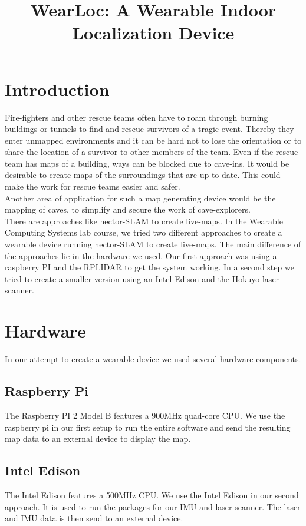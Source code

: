 \documentclass{sigchi-ext}
\title{WearLoc: A Wearable Indoor Localization Device}
\author{%
  \alignauthor{%
    \textbf{Lukas Gemein}\\
    \email{gemeinl@cs.uni-freiburg.de} }\alignauthor{%
    \textbf{Jennifer Nist}\\
    \email{nistj@cs.uni-freiburg.de} } \vfil \alignauthor{%
    \textbf{Rick Gelhausen}\\
    \email{rick.gelhausen@gmail.com} }\alignauthor{%
    \textbf{David Speck}\\
    \email{speckd@cs.uni-freiburg.de} } \vfil \alignauthor{%
    \textbf{Andre Biedenkapp}\\  
    \email{biedenka@cs.uni-freiburg.de}}}
\begin{document}
\maketitle

\RaggedRight{} 

\section{Introduction}
Fire-fighters and other rescue teams often have to roam through burning buildings or tunnels to find and rescue survivors of a tragic event. Thereby they enter unmapped environments and it can be hard not to lose the orientation or to share the location of a survivor to other members of the team. Even if the rescue team has maps of a building, ways can be blocked due to cave-ins. It would be desirable to create maps of the surroundings that are up-to-date. This could make the work for rescue teams easier and safer.\\
Another area of application for such a map generating device would be the mapping of caves, to simplify and secure the work of cave-explorers.\\
There are approaches like hector-SLAM to create live-maps. In the Wearable Computing Systems lab course, we tried two different approaches to create a wearable device running hector-SLAM to create live-maps. The main difference of the approaches lie in the hardware we used. Our first approach was using a raspberry PI and the RPLIDAR to get the system working. In a second step we tried to create a smaller version using an Intel Edison and the Hokuyo laser-scanner.\\
\newpage
\section{Hardware}
In our attempt to create a wearable device we used several hardware components.
\subsection{Raspberry Pi}
The Raspberry PI 2 Model B features a 900MHz quad-core CPU. We use the raspberry pi in our first setup to run the entire software and send the resulting map data to an external device to display the map.
\subsection{Intel Edison}
The Intel Edison features a 500MHz CPU. We use the Intel Edison in our second approach. It is used to run the packages for our IMU and laser-scanner. The laser and IMU data is then send to an external device.
\end{document}

